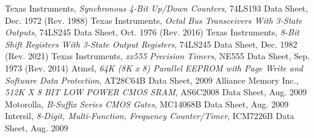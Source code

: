 \begin{thebibliography}{99}
 Texas Instruments, \emph{Synchronous 4-Bit Up/Down Counters}, 74LS193 Data Sheet, Dec. 1972 (Rev. 1988)
 Texas Instruments, \emph{Octal Bus Transceivers With 3-State Outputs}, 74LS245 Data Sheet, Oct. 1976 (Rev. 2016)
 Texas Instruments, \emph{8-Bit Shift Registers With 3-State Output Registers}, 74LS245 Data Sheet, Dec. 1982 (Rev. 2021)
 Texas Instruments, \emph{xx555 Precision Timers}, NE555 Data Sheet, Sep. 1973 (Rev. 2014)
 Atmel, \emph{64K (8K x 8) Parallel EEPROM with Page Write and Software Data Protection}, AT28C64B Data Sheet, 2009
 Alliance Memory Inc., \emph{512K X 8 BIT LOW POWER CMOS SRAM}, AS6C2008 Data Sheet, Aug. 2009
 Motorolla, \emph{B-Suffix Series CMOS Gates}, MC14068B Data Sheet, Aug. 2009
 Intersil, \emph{8-Digit, Multi-Function, Frequency Counter/Timer}, ICM7226B Data Sheet, Aug. 2009
\end{thebibliography}

